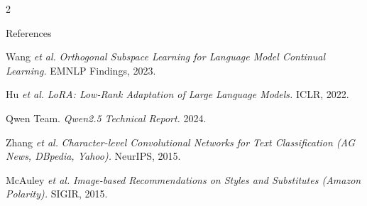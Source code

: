 \documentclass[portrait,a0,final]{a0poster}
\begin{document}
\begin{multicols}{2}
\begin{secbox}{References}
\normalsize
\begin{enumerate}[leftmargin=1.6em,topsep=2pt,itemsep=2pt,label={[\arabic*]}]
  \item Wang \emph{et al.} \emph{Orthogonal Subspace Learning for Language Model
        Continual Learning.} EMNLP Findings, 2023.
  \item Hu \emph{et al.} \emph{LoRA: Low-Rank Adaptation of Large Language Models.}
        ICLR, 2022.
  \item Qwen Team. \emph{Qwen2.5 Technical Report.} 2024.
  \item Zhang \emph{et al.} \emph{Character-level Convolutional Networks for Text
        Classification (AG News, DBpedia, Yahoo).} NeurIPS, 2015.
  \item McAuley \emph{et al.} \emph{Image-based Recommendations on Styles and
        Substitutes (Amazon Polarity).} SIGIR, 2015.
\end{enumerate}
\end{secbox}

\end{multicols}
\end{document}
